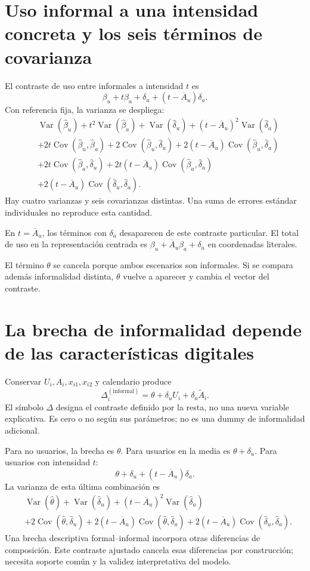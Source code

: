 \documentclass[11pt,a4paper]{article}
\DeclareMathOperator{\Var}{Var}
\DeclareMathOperator{\Cov}{Cov}
\begin{document}
\clearpage
\section{Uso informal a una intensidad concreta y los seis términos de covarianza}

El contraste de uso entre informales a intensidad $t$ es
\[
\beta_u+t\beta_a+\delta_u+(t-\overline A_u)\delta_a.
\]
Con referencia fija, la varianza se despliega:
\[
\begin{aligned}
&\Var(\widehat\beta_u)+t^2\Var(\widehat\beta_a)
+\Var(\widehat\delta_u)+(t-\overline A_u)^2\Var(\widehat\delta_a)\\
&+2t\Cov(\widehat\beta_u,\widehat\beta_a)
+2\Cov(\widehat\beta_u,\widehat\delta_u)
+2(t-\overline A_u)\Cov(\widehat\beta_u,\widehat\delta_a)\\
&+2t\Cov(\widehat\beta_a,\widehat\delta_u)
+2t(t-\overline A_u)\Cov(\widehat\beta_a,\widehat\delta_a)\\
&+2(t-\overline A_u)\Cov(\widehat\delta_u,\widehat\delta_a).
\end{aligned}
\]
Hay cuatro varianzas y seis covarianzas distintas. Una suma de errores estándar individuales no reproduce esta cantidad.

En $t=\overline A_u$, los términos con $\delta_a$ desaparecen de este contraste particular. El total de uso en la representación centrada es $\beta_u+\overline A_u\beta_a+\delta_u$ en coordenadas literales.

El término $\theta$ se cancela porque ambos escenarios son informales. Si se compara además informalidad distinta, $\theta$ vuelve a aparecer y cambia el vector del contraste.

\clearpage
\section{La brecha de informalidad depende de las características digitales}

Conservar $U_i,A_i,x_{i1},x_{i2}$ y calendario produce
\[
\Delta_i^{(\mathrm{informal})}
=\theta+\delta_uU_i+\delta_a\widetilde A_i.
\]
El símbolo $\Delta$ designa el contraste definido por la resta, no una nueva variable explicativa. Es cero o no según sus parámetros; no es una dummy de informalidad adicional.

Para no usuarios, la brecha es $\theta$. Para usuarios en la media es $\theta+\delta_u$. Para usuarios con intensidad $t$:
\[
\theta+\delta_u+(t-\overline A_u)\delta_a.
\]
La varianza de esta última combinación es
\[
\begin{aligned}
&\Var(\widehat\theta)+\Var(\widehat\delta_u)
+(t-\overline A_u)^2\Var(\widehat\delta_a)\\
&+2\Cov(\widehat\theta,\widehat\delta_u)
+2(t-\overline A_u)\Cov(\widehat\theta,\widehat\delta_a)
+2(t-\overline A_u)\Cov(\widehat\delta_u,\widehat\delta_a).
\end{aligned}
\]
Una brecha descriptiva formal--informal incorpora otras diferencias de composición. Este contraste ajustado cancela esas diferencias por construcción; necesita soporte común y la validez interpretativa del modelo.
\end{document}
